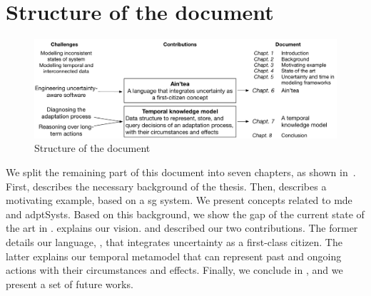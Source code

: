 \section{Structure of the document}

\begin{figure}
	\includegraphics[width=\linewidth]{img/chapt-intro/struct/struct}
	\caption{Structure of the document}
	\label{fig:intro:structDoc}
\end{figure}

We split the remaining part of this document into seven chapters, as shown in~.
First,  describes the necessary background of the thesis.
Then,  describes a motivating example, based on a \gls{sg} system.
We present concepts related to \gls{mde} and \glspl{adptSyst}.
Based on this background, we show the gap of the current state of the art in .
 explains our vision.
 and  described our two contributions.
The former details our language, \langName, that integrates uncertainty as a first-class citizen.
The latter explains our temporal \gls{metamodel} that can represent past and ongoing \glspl{action} with their circumstances and effects.
Finally, we conclude in , and we present a set of future works.